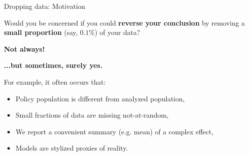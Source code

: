 \begin{frame}{Dropping data: Motivation}

Would you be concerned if you could \textbf{reverse your conclusion} by removing
a \textbf{small proportion} (say, $0.1\%$) of your data?

\pause
\textbf{Not always!}


\pause
\textbf{...but sometimes, surely yes.}

For example, it often occurs that:
%
\begin{itemize}
\item Policy population is different from analyzed population,
\item Small fractions of data are missing not-at-random,
\item We report a convenient summary (e.g. mean) of a complex effect,
\item Models are stylized proxies of reality.
\end{itemize}


\end{frame}



